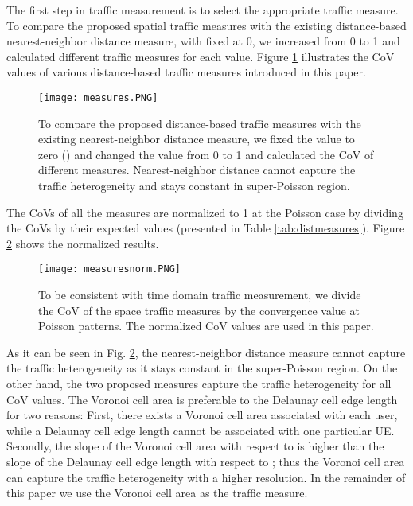 \documentclass[journal]{IEEEtran}
\begin{document}
The first step in traffic measurement is to select the appropriate traffic measure. To compare the proposed spatial traffic measures with the existing distance-based nearest-neighbor distance measure, with  fixed at 0, we increased  from 0 to 1 and calculated different traffic measures for each  value. Figure \ref{fig:measures} illustrates the CoV values of various distance-based traffic measures introduced in this paper.

\begin{figure}
\centering
\texttt{[image: measures.PNG]}
\caption{To compare the proposed distance-based traffic measures with the existing nearest-neighbor distance measure, we fixed the  value to zero () and changed the  value from 0 to 1 and calculated the CoV of different measures. Nearest-neighbor distance cannot capture the traffic heterogeneity and stays constant in super-Poisson region.}
\label{fig:measures}
\end{figure}

The CoVs of all the measures are normalized to 1 at the Poisson case by dividing the CoVs by their expected values (presented in Table \ref{tab:distmeasures}). Figure \ref{fig:measuresnorm} shows the normalized results.

\begin{figure}
\centering
\texttt{[image: measuresnorm.PNG]}
\caption{To be consistent with time domain traffic measurement, we divide the CoV of the space traffic measures by the convergence value at Poisson patterns. The normalized CoV values are used in this paper.}
\label{fig:measuresnorm}
\end{figure}

As it can be seen in Fig. \ref{fig:measuresnorm}, the nearest-neighbor distance measure cannot capture the traffic heterogeneity as it stays constant in the super-Poisson region. On the other hand, the two proposed measures capture the traffic heterogeneity for all CoV values. The Voronoi cell area is preferable to the Delaunay cell edge length for two reasons: First, there exists a Voronoi cell area associated with each user, while a Delaunay cell edge length cannot be associated with one particular UE. Secondly, the slope of the Voronoi cell area with respect to  is higher than the slope of the Delaunay cell edge length with respect to ; thus the Voronoi cell area can capture the traffic heterogeneity with a higher resolution. In the remainder of this paper we use the Voronoi cell area as the traffic measure.
\end{document}
